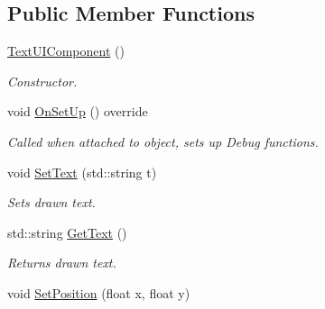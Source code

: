 \subsection*{Public Member Functions}
\begin{DoxyCompactItemize}
\item 
\hypertarget{class_text_u_i_component_a42895c18da48aeb5f68d5a1494315b62}{\hyperlink{class_text_u_i_component_a42895c18da48aeb5f68d5a1494315b62}{Text\+U\+I\+Component} ()}\label{class_text_u_i_component_a42895c18da48aeb5f68d5a1494315b62}

\begin{DoxyCompactList}\small\item\em Constructor. \end{DoxyCompactList}\item 
\hypertarget{class_text_u_i_component_a44791a353dbe82c4112f9f77fbaa27f2}{void \hyperlink{class_text_u_i_component_a44791a353dbe82c4112f9f77fbaa27f2}{On\+Set\+Up} () override}\label{class_text_u_i_component_a44791a353dbe82c4112f9f77fbaa27f2}

\begin{DoxyCompactList}\small\item\em Called when attached to object, sets up Debug functions. \end{DoxyCompactList}\item 
\hypertarget{class_text_u_i_component_a4fa8c750a70ed097055af9bed210160e}{void \hyperlink{class_text_u_i_component_a4fa8c750a70ed097055af9bed210160e}{Set\+Text} (std\+::string t)}\label{class_text_u_i_component_a4fa8c750a70ed097055af9bed210160e}

\begin{DoxyCompactList}\small\item\em Sets drawn text. \end{DoxyCompactList}\item 
\hypertarget{class_text_u_i_component_a9374a6f35d7c970fef866c58fdc9d86f}{std\+::string \hyperlink{class_text_u_i_component_a9374a6f35d7c970fef866c58fdc9d86f}{Get\+Text} ()}\label{class_text_u_i_component_a9374a6f35d7c970fef866c58fdc9d86f}

\begin{DoxyCompactList}\small\item\em Returns drawn text. \end{DoxyCompactList}\item 
\hypertarget{class_text_u_i_component_a6b950479f75950657f2a694b95e637fa}{void \hyperlink{class_text_u_i_component_a6b950479f75950657f2a694b95e637fa}{Set\+Position} (float x, float y)}\label{class_text_u_i_component_a6b950479f75950657f2a694b95e637fa}


\end{DoxyCompactItemize}
